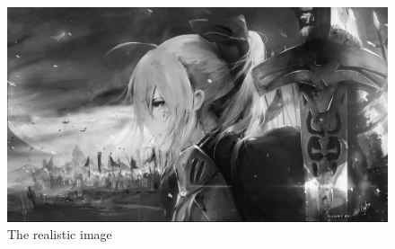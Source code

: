 \documentclass{article}
\begin{document}






\begin{figure}[H]
	\centering 
	\includegraphics[width=12cm]{./fig/image_gray.jpeg}
	\caption{The realistic image}
\end{figure}
\end{document}
